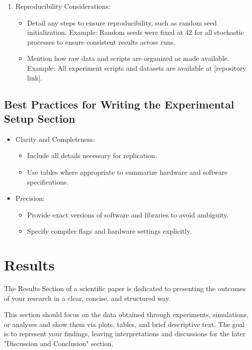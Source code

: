 \documentclass[conference]{IEEEtran}
\begin{document}
\begin{enumerate}
\item Reproducibility Considerations:  
\begin{itemize}
   \item Detail any steps to ensure reproducibility, such as random seed initialization. Example: Random seeds were fixed at 42 for all stochastic processes to ensure consistent results across runs.  
   \item Mention how raw data and scripts are organized or made available. Example: All experiment scripts and datasets are available at [repository link].
\end{itemize}
\end{enumerate}

\subsection{Best Practices for Writing the Experimental Setup Section}
\begin{itemize}
\item  Clarity and Completeness:  
\begin{itemize}
   \item Include all details necessary for replication.  
   \item Use tables where appropriate to summarize hardware and software specifications.  
\end{itemize}

\item Precision:  
\begin{itemize}
   \item Provide exact versions of software and libraries to avoid ambiguity.  
   \item Specify compiler flags and hardware settings explicitly.
\end{itemize}
\end{itemize}

\section{Results}\label{sec:results}
The Results Section of a scientific paper is dedicated to presenting the outcomes of your research in a clear, concise, and structured way.

This section should focus on the data obtained through experiments, simulations, or analyses and show them via plots, tables, and brief descriptive text. The goal is to represent your findings, leaving interpretations and discussions for the later "Discussion and Conclusion" section.  
\end{document}
